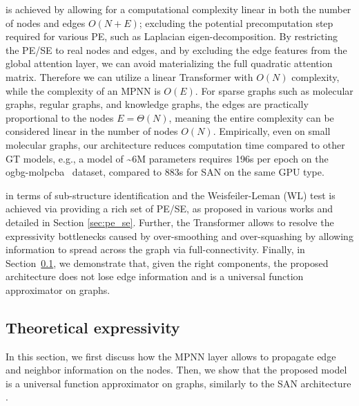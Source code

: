 \documentclass{article}
\begin{document}
 is achieved by allowing for a computational complexity linear in both the number of nodes and edges $O(N+E)$; excluding the potential precomputation step required for various PE, such as Laplacian eigen-decomposition.
By restricting the PE/SE to real nodes and edges, and by excluding the edge features from the global attention layer, we can avoid materializing the full quadratic attention matrix. Therefore we can utilize a linear Transformer with $O(N)$ complexity, while the complexity of an MPNN is $O(E)$. For sparse graphs such as molecular graphs, regular graphs, and knowledge graphs, the edges are practically proportional to the nodes $E = \Theta(N)$, meaning the entire complexity can be considered linear in the number of nodes $O(N)$.
Empirically, even on small molecular graphs, our architecture reduces computation time compared to other GT models, e.g., a model of \textasciitilde6M parameters requires 196s per epoch on the ogbg-molpcba~\cite{hu2020ogb} dataset, compared to 883s for SAN \cite{kreuzer2021rethinking} on the same GPU type.


 in terms of sub-structure identification and the Weisfeiler-Leman (WL) test is achieved via providing a rich set of PE/SE, as proposed in various works \cite{beaini2021directional_dgn, kreuzer2021rethinking, dwivedi2022LPE, bodnar2021weisfeiler_CIN, bouritsas2022improving_GSN} and detailed in Section \ref{sec:pe_se}. Further, the Transformer allows to resolve the expressivity bottlenecks caused by over-smoothing \cite{kreuzer2021rethinking} and over-squashing \cite{alon2021on} by allowing information to spread across the graph via full-connectivity. Finally, in Section~\ref{sec:theory}, we demonstrate that, given the right components, the proposed architecture does not lose edge information and is a universal function approximator on graphs.



\subsection{Theoretical expressivity}\label{sec:theory}
In this section, we first discuss how the MPNN layer allows to propagate edge and neighbor information on the nodes. Then, we show that the proposed model is a universal function approximator on graphs, similarly to the SAN architecture \cite{kreuzer2021rethinking}.
\end{document}
